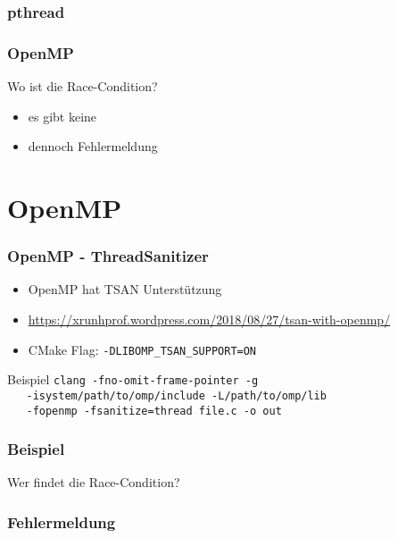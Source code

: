 \documentclass[xcolor=dvipsnames,hyperref={pdfpagelabels=false}]{beamer}
\begin{document}
\begin{frame}[fragile]
	\frametitle{pthread}
	
	
\end{frame}


\begin{frame}[fragile]
	\frametitle{OpenMP}
	
	\bigskip
	Wo ist die Race-Condition?\\\pause
	\begin{itemize}
		 \item es gibt keine\\\pause
		 \item dennoch Fehlermeldung
	\end{itemize}
\end{frame}

\section{OpenMP}
\begin{frame}
	\frametitle{OpenMP - ThreadSanitizer}
	\begin{itemize}
		\item OpenMP hat TSAN Unterstützung
		\item \url{https://xrunhprof.wordpress.com/2018/08/27/tsan-with-openmp/}
		\item CMake Flag: \texttt{-DLIBOMP\_TSAN\_SUPPORT=ON}
	\end{itemize}

	\begin{block}{Beispiel}
		\medskip	
		\texttt{clang -fno-omit-frame-pointer -g}\\
		\texttt{~~~-isystem/path/to/omp/include -L/path/to/omp/lib}\\
		\texttt{~~~-fopenmp -fsanitize=thread file.c -o out}
	\end{block}
\end{frame}

\begin{frame}
\frametitle{Beispiel}
	
	\medskip
	Wer findet die Race-Condition?
	\vspace*{1cm}
\end{frame}

\begin{frame}
	\frametitle{Fehlermeldung}
	
	\vspace*{1cm}
\end{frame}
\end{document}
